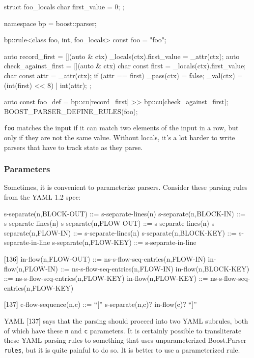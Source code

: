 \begin{code}
struct foo_locals
{
    char first_value = 0;
};

namespace bp = boost::parser;

bp::rule<class foo, int, foo_locals> const foo = "foo";

auto record_first = [](auto & ctx) { _locals(ctx).first_value = _attr(ctx); }
auto check_against_first = [](auto & ctx) {
    char const first = _locals(ctx).first_value;
    char const attr = _attr(ctx);
    if (attr == first)
        _pass(ctx) = false;
    _val(ctx) = (int(first) << 8) | int(attr);
};

auto const foo_def = bp::cu[record_first] >> bp::cu[check_against_first];
BOOST_PARSER_DEFINE_RULES(foo);
\end{code}

\texttt{foo} matches the input if it can match two elements of the input in a row, but only if they are not the same value. Without locals, it's a lot harder to write parsers that have to track state as they parse.

\subsubsection{Parameters}

Sometimes, it is convenient to parameterize parsers. Consider these parsing rules from the YAML 1.2 spec:

\begin{code}
[80]
s-separate(n,BLOCK-OUT) ::= s-separate-lines(n)
s-separate(n,BLOCK-IN)  ::= s-separate-lines(n)
s-separate(n,FLOW-OUT)  ::= s-separate-lines(n)
s-separate(n,FLOW-IN)   ::= s-separate-lines(n)
s-separate(n,BLOCK-KEY) ::= s-separate-in-line
s-separate(n,FLOW-KEY)  ::= s-separate-in-line

[136]
in-flow(n,FLOW-OUT)  ::= ns-s-flow-seq-entries(n,FLOW-IN)
in-flow(n,FLOW-IN)   ::= ns-s-flow-seq-entries(n,FLOW-IN)
in-flow(n,BLOCK-KEY) ::= ns-s-flow-seq-entries(n,FLOW-KEY)
in-flow(n,FLOW-KEY)  ::= ns-s-flow-seq-entries(n,FLOW-KEY)

[137]
c-flow-sequence(n,c) ::= “[” s-separate(n,c)? in-flow(c)? “]”
\end{code}

YAML {[}137{]} says that the parsing should proceed into two YAML subrules, both of which have these \texttt{n} and \texttt{c} parameters. It is certainly possible to transliterate these YAML parsing rules to something that uses unparameterized Boost.Parser \texttt{rules}, but it is quite painful to do so. It is better to use a parameterized rule.

